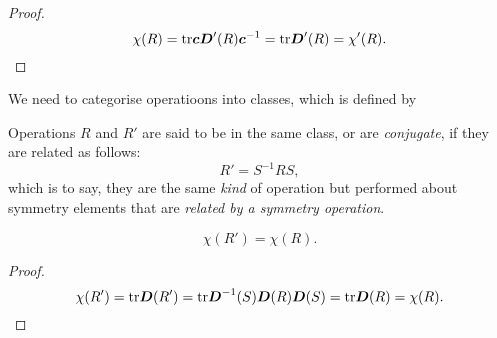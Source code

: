 \begin{proof}
\begin{equation}
\chi(R)=\text{tr}\boldsymbol{cD}'(R)\boldsymbol{c}^{-1}=\text{tr}\boldsymbol{D}'(R)=\chi'(R).
\end{equation}
\end{proof}
We need to categorise operatioons into classes, which is defined by
\begin{defi}[Classes]
Operations $R$ and $R'$ are said to be in the same class, 
or are \textit{conjugate}, if they are related as follows:
\begin{equation}
R'=S^{-1}RS, 
\end{equation}
which is to say, they are the same \textit{kind} of operation but performed 
about symmetry elements that are \textit{related by a symmetry operation}. 
\end{defi}
\begin{thrm}
\begin{equation}
\chi(R')=\chi(R).
\end{equation}
\end{thrm}
\begin{proof}
\begin{equation}
\chi(R')=\text{tr}\boldsymbol{D}(R')=\text{tr}\boldsymbol{D}^{-1}(S)\boldsymbol{D}(R)\boldsymbol{D}(S)=\text{tr}\boldsymbol{D}(R)=\chi(R).
\end{equation}
\end{proof}
